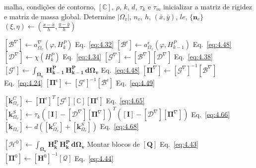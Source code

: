         \begin{algorithm}[htpb!]
        \caption{Implementação do método dos elementos virtuais}
        \label{alg:typical_vem}
        \begin{algorithmic}[1]
    
        \Require malha, condições de contorno, $[\mathbb{C}]$, $\rho$, $k$, $d$, $\tau_k$ e $\tau_m$
        \State inicializar a matriz de rigidez e matriz de massa global.
            \State Determine $|\Omega_v|$, $n_v$, $h$, $(\bar{x},\bar{y})$, $le$, $\{\mathbf{n}_{e}\}$
            \State $(\xi, \eta) \leftarrow \left(\frac{x-\bar{x}}{h}, \frac{y-\bar{y}}{h}\right)$
    

            \State $[\mathcal{B}^{\nabla}] \leftarrow a_{\Omega_v}^{\nabla}(\varphi, H_k^P)$ \hfill Eq.~\ref{eq:4.32}
            \State $[\mathcal{B}^{\epsilon}] \leftarrow a_{\Omega_v}^{\epsilon}(\varphi, H_{k-1}^P)$ \hfill Eq.~\ref{eq:4.48}
            \State $[\mathcal{D}^{\nabla}] \leftarrow \chi(H_k^P)$ \hfill Eq.~\ref{eq:4.34}
            \State $[\mathcal{G}^{\nabla}] \leftarrow [\mathcal{B}^{\nabla}][\mathcal{D}^{\nabla}]$ \hfill Eq.~\ref{eq:4.38}
            \State $[\mathcal{G}^{\epsilon}]  \leftarrow \mathbf{\int_{\Omega_v} \,H_{k-1}^P \, H_{k-1}^P \, d{\Omega_v}}$ \hfill Eq.~\ref{eq:4.48}
            \State $[\mathbf{\Pi}^{\nabla}] \leftarrow [\mathcal{G}^{\nabla}]^{-1}[\mathcal{B}^{\nabla}]$ \hfill Eq.~\ref{eq:4.24}
            \State $[\mathbf{\Pi}^{\epsilon}] \leftarrow [\mathcal{G}^{\epsilon}]^{-1}[\mathcal{B}^{\epsilon}]$ \hfill Eq.~\ref{eq:4.49}


            \State $[\mathbf{k}_{\Omega_v}^C] \leftarrow [\mathbf{\Pi}^{\epsilon}]^T [\mathcal{G}^{\epsilon}] [\mathbf{\mathbb{C}}] [\mathbf{\Pi}^{\epsilon}]$ \hfill Eq.~\ref{eq:4.65}
            \State $[\mathbf{k}_{\Omega_v}^S] \leftarrow \tau_k ([\mathbf{I}] - [\mathcal{D}^{\nabla}][\mathbf{\Pi}^{\nabla}])^T ([\mathbf{I}] - [\mathcal{D}^{\nabla}][\mathbf{\Pi}^{\nabla}])$ \hfill Eq.~\ref{eq:4.66}
            \State $[\mathbf{k}_{\Omega_v}] \leftarrow d \left( [\mathbf{k}_{\Omega_v}^C] + [\mathbf{k}_{\Omega_v}^S] \right)$ \hfill Eq.~\ref{eq:4.68}
    

            \State $[\mathcal{H}^0] \leftarrow \mathbf{\int_{\Omega_v} H_k^P \, H_k^P \, d{\Omega_v}}$ 
            \State Montar blocos de $[\mathbf{Q}]$ \hfill Eq.~\ref{eq:4.43}
            \State $[\mathbf{\Pi}^0] \leftarrow [\mathbf{H}^0]^{-1}[\mathcal{Q}]$ \hfill Eq.~\ref{eq:4.44}
    

\end{algorithmic}
\end{algorithm}
